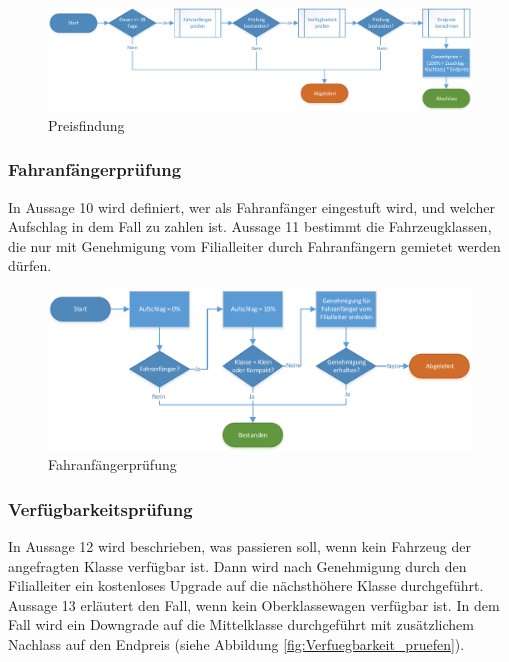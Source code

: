 \begin{figure}[tbh]
\centering
\includegraphics[width=1.0\linewidth]{Bilder/Preis_berechnen}
\caption{Preisfindung}
\label{fig:Preis_berechnen}
\end{figure}

\subsubsection{Fahranfängerprüfung}

In Aussage 10 wird definiert, wer als Fahranfänger eingestuft wird, und welcher Aufschlag in dem 
Fall zu zahlen ist. Aussage 11 bestimmt die Fahrzeugklassen, die nur mit Genehmigung vom Filialleiter
durch Fahranfängern gemietet werden dürfen.

\begin{figure}[H]
\centering
\includegraphics[width=1.0\linewidth]{Bilder/Fahranfaenger_pruefen}
\caption{Fahranfängerprüfung}
\label{fig:Fahranfänger_prüfen}
\end{figure}

\subsubsection{Verfügbarkeitsprüfung}

In Aussage 12 wird beschrieben, was passieren soll, wenn kein Fahrzeug der angefragten Klasse
verfügbar ist. Dann wird nach Genehmigung durch den Filialleiter ein kostenloses Upgrade 
auf die nächsthöhere Klasse durchgeführt. 
Aussage 13 erläutert den Fall, wenn kein Oberklassewagen verfügbar ist. In dem Fall wird
ein Downgrade auf die Mittelklasse durchgeführt mit zusätzlichem Nachlass auf den Endpreis (siehe Abbildung \ref{fig:Verfuegbarkeit_pruefen}).

